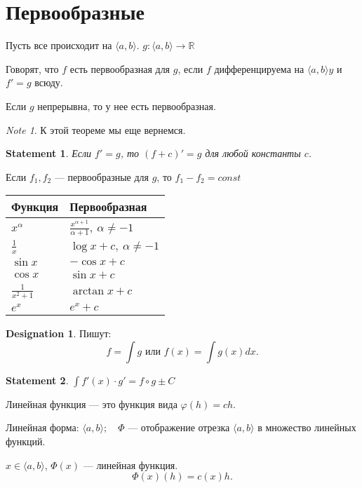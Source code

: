 \documentclass[11pt]{book}
\newcommand{\R}{\mathbb{R}}
\theoremstyle{definition}
\theoremstyle{plain}
\theoremstyle{plain}
\newtheorem*{st}{Statement}
\theoremstyle{definition}
\newtheorem*{name}{Designation}
\theoremstyle{remark}
\newtheorem*{note}{Note}
\begin{document}
\section{Первообразные}
Пусть все происходит на $ \langle a, b \rangle$. $ g : \langle a, b \rangle \to  \R$
\begin{defn}
    Говорят, что $ f$ есть первообразная для $ g$, если $ f$ дифференцируема на $ \langle a, b \rangle y$ и $ f' = g$ всюду.
\end{defn}
\begin{thm}
    Если $ g$   непрерывна, то у нее есть первообразная.
\end{thm}
\begin{note}
    К этой теореме мы еще вернемся.
\end{note}
\begin{st}
    Если $ f' = g$, то $ (f + c)' = g$ для любой константы  $ c$.
\end{st}
\begin{thm}
    Если $ f_1, f_2$ --- первообразные для $ g$, то $ f_1 - f_2 = const$
\end{thm}
\renewcommand{\arraystretch}{1.5}
\begin{tabular}[ht]{|l|l|}
    \hline
    Функция & Первообразная \\
    \hline
    $ x^{ \alpha }$ & $ \frac{x^{ \alpha + 1}}{\alpha + 1}, ~ \alpha \ne -1$\\
    \hline
    $ \frac{1}{x}$ & $ \log x + c, ~ \alpha \ne -1$ \\
    \hline
    $ \sin x$ & $ -\cos x + c$\\
    \hline
    $ \cos x$ & $ \sin x + c$\\
    \hline
    $ \frac{1}{x^2+1}$ & $ \arctan x + c$\\
    \hline
    $ e^{x}$ & $ e^{x} + c$ \\
    \hline
\end{tabular}
\begin{name}
    Пишут: \[
	f = \int g \text{ или } f(x) = \int g(x) dx
    .\]
\end{name}
\begin{st}
    $ \int f'(x) \cdot g' = f \circ g \pm C$
\end{st}
\begin{defn}
    Линейная функция --- это функция вида $ \varphi  (h) = ch$.

    Линейная форма:
    $\langle a, b \rangle; \quad \Phi $ --- отображение отрезка $ \langle a, b \rangle$ в множество линейных функций.

    $ x \in  \langle a, b \rangle$, $ \Phi(x) $ --- линейная функция.
    \[
	\Phi(x)(h) = c (x) h
    .\]
\end{defn}
\end{document}
